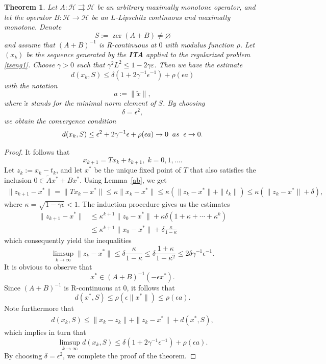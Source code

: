 \documentclass[10pt,a4paper]{amsart}
\newtheorem{theorem}{Theorem}
\newcommand{\zer}{\operatorname{zer}}
\begin{document}
\begin{theorem}\label{thm:ita} Let $A:\mathcal{H}\rightrightarrows \mathcal{H}$ be an arbitrary maximally monotone operator, and let the operator $B:\mathcal{H}\to\mathcal{H}$ be an $L$-Lipschitz continuous and maximally monotone. Denote 
\[
S:=\zer (A+B)\neq\varnothing
\]
and assume that $(A+B)^{-1}$ is R-continuous at $0$ with modulus function $\rho$. Let $(x_k)$ be the sequence generated by the {\bf ITA} applied to the regularized problem \eqref{tseng1}. Choose $\gamma>0$ such that $\gamma^2 L^2\le 1-2\gamma\varepsilon $.
Then we have the estimate
\begin{equation}
d(x_k,S)
\leq
\delta(1+2\gamma^{-1}\epsilon^{-1})
+
\rho(\epsilon a)
\end{equation}
with the notation
\[
a:=\|\widetilde{x}\|,
\]
where $\widetilde{x}$ stands for the minimal norm element of $S$. 
By choosing
\[
\delta=\epsilon^2,
\]
we obtain the convergence condition
\begin{equation*}
d(x_k,S)
\leq
\epsilon^2+2\gamma^{-1}\epsilon+\rho(\epsilon a)\to 0 \;\; {\rm as}\; \;\epsilon\to 0.
\end{equation*}
\end{theorem}

\begin{proof}
It follows that
$$
x_{k+1}= Tx_k+t_{k+1},\;k=0,1,\ldots.
$$
Let $z_k:=x_{k}-t_k$, and let $x^*$ be the unique fixed point of $T$ that also satisfies the inclusion $0\in \tilde{A}x^*+Bx^*$. Using Lemma~\ref{ab}, we get
\begin{align*}
\|z_{k+1}-x^*\|
=\| Tx_k-x^*\|\le \kappa\|x_k-x^*\|
\leq
\kappa(\|z_k-x^*\|+\|t_k\|)\le \kappa(\|z_k-x^*\|+\delta),
\end{align*}
where $\kappa=\sqrt{1-\gamma\epsilon}<1$. The induction procedure gives us the estimates
\begin{align*}
\|z_{k+1}-x^*\|
&\leq
\kappa^{k+1}\|z_0-x^*\|
+
\kappa\delta(1+\kappa+\cdots+\kappa^k) \\
&\leq
\kappa^{k+1}\|x_0-x^*\|
+
\delta\frac{\kappa}{1-\kappa}
\end{align*}
which consequently yield the inequalities
\[
\limsup_{k\to\infty}\|z_k-x^*\|
\leq
\delta\frac{\kappa}{1-\kappa}\le\delta\frac{1+\kappa}{1-\kappa^2} \le 2\delta \gamma^{-1}\epsilon^{-1}.
\]
It is {obvious} to observe that
\[
x^*\in (A+B)^{-1}(-\epsilon x^*).
\]
Since $(A+B)^{-1}$ is R-continuous at $0$, it follows that
\[
d(x^*,S)
\leq
\rho(\epsilon\|x^*\|)\le\rho(\epsilon a).
\]
Note furthermore that
\begin{align*}
d(x_k,S)
\leq
\|x_k-z_k\|
+
\|z_k-x^*\|
+
d(x^*,S),
\end{align*}
which implies in turn that
$$
\limsup_{k\to\infty} d(x_k,S)\leq
\delta(1+
2\gamma^{-1}\epsilon^{-1})
+
\rho(\epsilon a).
$$
By choosing $\delta=\epsilon^{2}$, we complete the proof of the theorem.
\end{proof}
\end{document}
